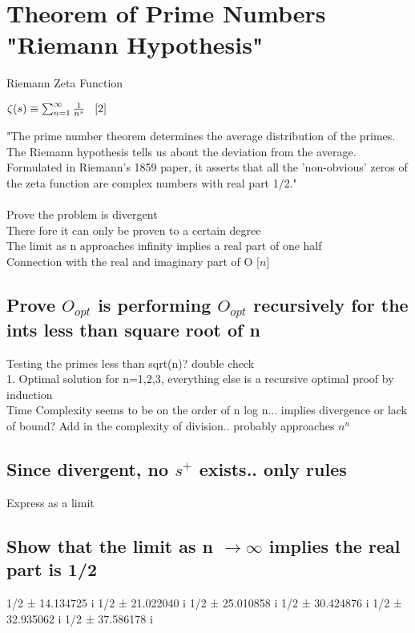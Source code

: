 \documentclass[11pt]{article}
\begin{document}
\newpage
\section{Theorem of Prime Numbers "Riemann Hypothesis"}
Riemann Zeta Function
\begin{center}
$
\zeta (s) \equiv \sum_{n=1}^{\infty} \frac{1}{n^s} \hspace{3mm} \lbrack 2 \rbrack
$
\end{center}
"The prime number theorem determines the average distribution of the primes. The Riemann hypothesis tells us about the deviation from the average. Formulated in Riemann's 1859 paper, it asserts that all the 'non-obvious' zeros of the zeta function are complex numbers with real part 1/2." \rbrack\\
\\
Prove the problem is divergent\\
There fore it can only be proven to a certain degree\\
The limit as n approaches infinity implies a real part of one half\\
Connection with the real and imaginary part of O $\lbrack n \rbrack$

\subsection{Prove $O_{opt}$ is performing $O_{opt}$ recursively for the ints less than square root of n}
Testing the primes less than sqrt(n)? double check \\
1. Optimal solution for n=1,2,3, everything else is a recursive optimal proof by induction\\
Time Complexity seems to be on the order of n log n... implies divergence or lack of bound? Add in the complexity of division.. probably approaches $n^n$


\subsection{Since divergent, no $s^{+}$ exists.. only rules}
Express as a limit

\subsection{Show that the limit as n $\rightarrow \infty$ implies the real part is 1/2}
1/2 ± 14.134725 i
1/2 ± 21.022040 i
1/2 ± 25.010858 i
1/2 ± 30.424876 i
1/2 ± 32.935062 i
1/2 ± 37.586178 i
\end{document}

